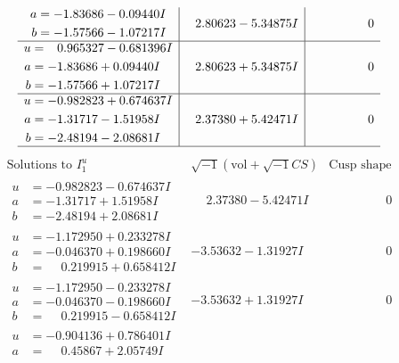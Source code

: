 \documentclass[1p]{elsarticle_modified}
\theoremstyle{definition}
\newcommand{\I}{\sqrt{-1}}
\begin{document}
$$\begin{array}{c|c|c}
\begin{aligned}
a &= -1.83686 - 0.09440 I \\
b &= -1.57566 - 1.07217 I\end{aligned}
 & \phantom{-}2.80623 - 5.34875 I & \phantom{-0.000000 } 0 \\ \hline\begin{aligned}
u &= \phantom{-}0.965327 - 0.681396 I \\
a &= -1.83686 + 0.09440 I \\
b &= -1.57566 + 1.07217 I\end{aligned}
 & \phantom{-}2.80623 + 5.34875 I & \phantom{-0.000000 } 0 \\ \hline\begin{aligned}
u &= -0.982823 + 0.674637 I \\
a &= -1.31717 - 1.51958 I \\
b &= -2.48194 - 2.08681 I\end{aligned}
 & \phantom{-}2.37380 + 5.42471 I & \phantom{-0.000000 } 0\\
 \hline 
 \end{array}$$\newpage$$\begin{array}{c|c|c}  
\text{Solutions to }I^u_{1}& \I (\text{vol} + \sqrt{-1}CS) & \text{Cusp shape}\\
 \hline 
\begin{aligned}
u &= -0.982823 - 0.674637 I \\
a &= -1.31717 + 1.51958 I \\
b &= -2.48194 + 2.08681 I\end{aligned}
 & \phantom{-}2.37380 - 5.42471 I & \phantom{-0.000000 } 0 \\ \hline\begin{aligned}
u &= -1.172950 + 0.233278 I \\
a &= -0.046370 + 0.198660 I \\
b &= \phantom{-}0.219915 + 0.658412 I\end{aligned}
 & -3.53632 - 1.31927 I & \phantom{-0.000000 } 0 \\ \hline\begin{aligned}
u &= -1.172950 - 0.233278 I \\
a &= -0.046370 - 0.198660 I \\
b &= \phantom{-}0.219915 - 0.658412 I\end{aligned}
 & -3.53632 + 1.31927 I & \phantom{-0.000000 } 0 \\ \hline\begin{aligned}
u &= -0.904136 + 0.786401 I \\
a &= \phantom{-}0.45867 + 2.05749 I \\

\end{aligned}
\end{array}$$
\end{document}
